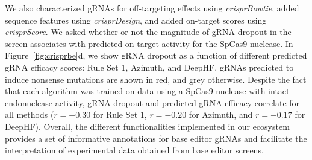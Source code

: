 \documentclass[pdftex,english,10pt]{article}
\begin{document}
We also characterized gRNAs for off-targeting effects using \textit{crisprBowtie}, added sequence features using \textit{crisprDesign}, and added on-target scores using \textit{crisprScore}. We asked whether or not the magnitude of gRNA dropout in the screen associates with predicted on-target activity for the SpCas9 nuclease. In Figure~\ref{fig:crisprbe}d, we show gRNA dropout as a function of different predicted gRNA efficacy scores: Rule Set 1, Azimuth, and DeepHF.  gRNAs predicted to induce nonsense mutations are shown in red, and grey otherwise. Despite the fact that each algorithm was trained on data using a SpCas9 nuclease with intact endonuclease activity, gRNA dropout and predicted gRNA efficacy correlate for all methods ($r = -0.30$ for Rule Set 1, $r =  -0.20$ for Azimuth, and $r = -0.17$ for DeepHF). Overall, the different functionalities implemented in our ecosystem provides a set of informative annotations for base editor gRNAs and facilitate the interpretation of experimental data obtained from base editor screens.
\end{document}
